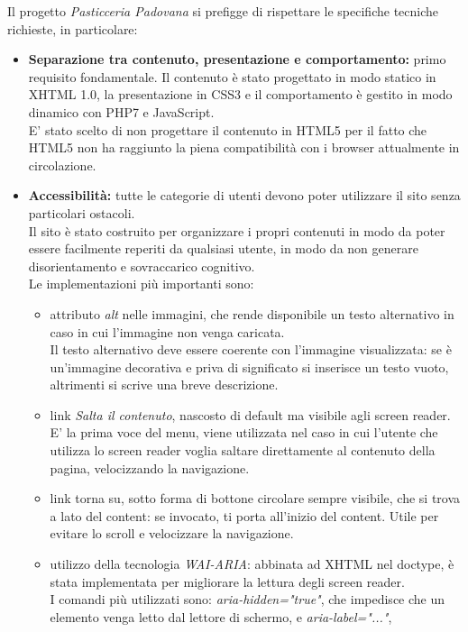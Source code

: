 Il progetto \emph{Pasticceria Padovana} si prefigge di rispettare le specifiche tecniche richieste, in particolare:
\begin{itemize}
	\item \textbf{Separazione tra contenuto, presentazione e comportamento:} primo requisito fondamentale. 
	Il contenuto è stato progettato in modo statico in XHTML 1.0, la presentazione in CSS3 e il comportamento è gestito in modo dinamico con PHP7 e JavaScript.\\
	E' stato scelto di non progettare il contenuto in HTML5 per il fatto che HTML5 non ha raggiunto la piena compatibilità con i browser attualmente in circolazione.\\
	\item \textbf{Accessibilità:} tutte le categorie di utenti devono poter utilizzare il sito senza particolari ostacoli.\\ 
	Il sito è stato costruito per organizzare i propri contenuti in modo da poter essere facilmente reperiti da qualsiasi utente, 
	in modo da non generare disorientamento e sovraccarico cognitivo.\\ 
	Le implementazioni più importanti sono:
	\begin{itemize}
		\item attributo \emph{alt} nelle immagini, che rende disponibile un testo alternativo in caso in cui l'immagine non venga caricata.\\ 
		Il testo alternativo deve essere coerente con l'immagine visualizzata: se è un'immagine decorativa e priva di significato si inserisce un testo vuoto, 
		altrimenti si scrive una breve descrizione.
		\item link \emph{Salta il contenuto}, nascosto di default ma visibile agli screen reader. E' la prima voce del menu, viene utilizzata nel caso in cui l'utente che
		utilizza lo screen reader voglia saltare direttamente al contenuto della pagina, velocizzando la navigazione.\\
		\item link {torna su}, sotto forma di bottone circolare sempre visibile, che si trova a lato del content: se invocato, ti porta all'inizio del content. 
		Utile per evitare lo scroll e velocizzare la navigazione.
		\item utilizzo della tecnologia \emph{WAI-ARIA}: abbinata ad XHTML nel doctype, è stata implementata per migliorare la lettura degli screen reader.\\
		I comandi più utilizzati sono: \emph{aria-hidden="true"}, che impedisce che un elemento venga letto dal lettore di schermo, e \emph{aria-label="..."}, 

\end{itemize}
\end{itemize}
